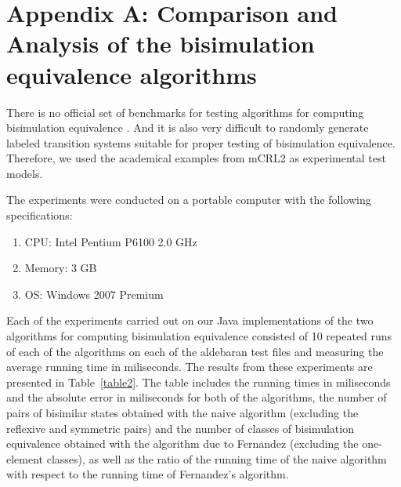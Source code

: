 \appendix
\section*{Appendix A: Comparison and Analysis of the bisimulation equivalence algorithms}
\label{appendixA}

There is no official set of benchmarks for testing algorithms for computing bisimulation equivalence \cite{PiazzaPolicriti}. And it is also very difficult to randomly generate labeled transition systems suitable for proper testing of bisimulation equivalence. Therefore, we used the academical examples from mCRL2 as experimental test models. 

The experiments were conducted on a portable computer with the following specifications: 
\begin{enumerate}
	\item CPU: Intel Pentium P6100 2.0 GHz
	\item Memory: 3 GB
	\item OS: Windows 2007 Premium
\end{enumerate}

Each of the experiments carried out on our Java implementations of the two algorithms for computing bisimulation equivalence consisted of 10 repeated runs of each of the algorithms on each of the aldebaran test files and measuring the average running time in miliseconds. 
The results from these experiments are presented in Table~\ref{table2}. The table includes the running times in miliseconds and the absolute error in miliseconds for both of the algorithms, the number of pairs of bisimilar states obtained with the naive algorithm (excluding the reflexive and symmetric pairs) and the number of classes of bisimulation equivalence obtained with the algorithm due to Fernandez (excluding the one-element classes), as well as the ratio of the running time of the naive algorithm with respect to the running time of Fernandez's algorithm.

